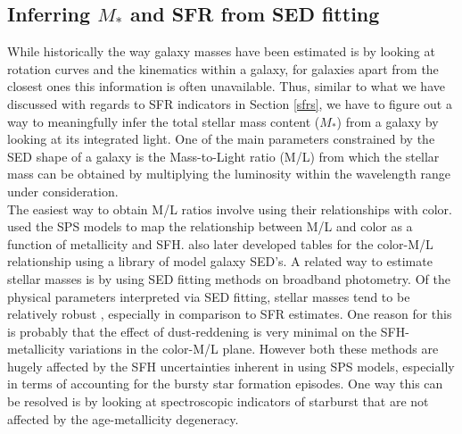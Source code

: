 \subsection{Inferring $M_{*}$ and SFR from SED fitting}
\label{masses}

While historically the way galaxy masses have been estimated is by looking at rotation curves and the kinematics within a galaxy, for galaxies apart from the closest ones this information is often unavailable. Thus, similar to what we have discussed with regards to SFR indicators in Section \ref{sfrs}, we have to figure out a way to meaningfully infer the total stellar mass content ($M_{*}$) from a galaxy by looking at its integrated light. One of the main parameters constrained by the SED shape of a galaxy is the Mass-to-Light ratio (M/L) from which the stellar mass can be obtained by multiplying the luminosity within the wavelength range under consideration.\\

The easiest way to obtain M/L ratios involve using their relationships with color. \citet{2001ApJ...550..212B} used the \citet{bruzual_stellar_2003} SPS models to map the relationship between M/L and color as a function of metallicity and SFH. \citep{2009MNRAS.400.1181Z} also later developed tables for the color-M/L relationship using a library of model galaxy SED's. A related way to estimate stellar masses is by using SED fitting methods on broadband photometry. Of the physical parameters interpreted via SED fitting, stellar masses tend to be relatively robust \citep{2001ApJ...559..620P, 2009ApJ...701.1839M}, especially in comparison to SFR estimates. One reason for this is probably that the effect of dust-reddening is very minimal on the SFH-metallicity variations in the color-M/L plane. However both these methods are hugely affected by the SFH uncertainties inherent in using SPS models, especially in terms of accounting for the bursty star formation episodes. One way this can be resolved is by looking at spectroscopic indicators of starburst that are not affected by the age-metallicity degeneracy.\\

